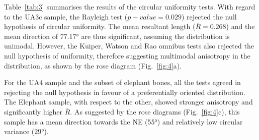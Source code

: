 \documentclass[preprint,authoryear,times]{elsarticle} %
\begin{document}
\begin{table}[]
  \caption{Value and $p-value$ of circular uniformity test statistics.}
  \label{tab:3}
\end{table}

Table~\ref{tab:3} summarises the results of the circular uniformity tests.
With regard to the UA3c sample, the Rayleigh test ($p-value=0.029$) rejected the null hypothesis of circular uniformity. The mean resultant length ($\bar{R}=0.268$) and the mean direction of 77.17° are thus significant, assuming the distribution is unimodal. However, the Kuiper, Watson and Rao omnibus tests also rejected the null hypothesis of uniformity, therefore suggesting multimodal anisotropy in the distribution, as shown by the rose diagram (Fig.~\ref{fig:4}a).

For the UA4 sample and the subset of elephant bones, all the tests agreed in rejecting the null hypothesis in favour of a preferentially oriented distribution. The Elephant sample, with respect to the other, showed stronger anisotropy and significantly higher $\bar{R}$. As suggested by the rose diagrams (Fig.~\ref{fig:4}c), this sample has a mean direction towards the NE (55°) and relatively low circular variance (29°).
\end{document}
